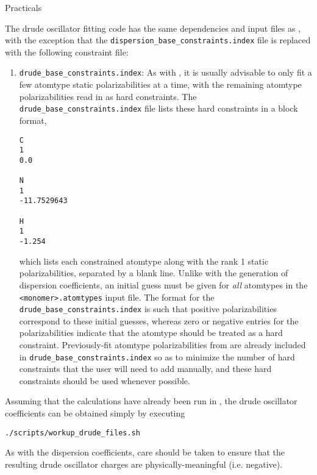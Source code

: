 \begin{subsubsection}{Practicals}

The drude oscillator fitting code has the same dependencies and input files as
\idma, with the exception that the \verb|dispersion_base_constraints.index|
file is replaced with the following constraint file:
\begin{enumerate}
\item \verb|drude_base_constraints.index|: As with \idma,
it is usually advisable to only fit a few atomtype static polarizabilities at a
time, with the remaining atomtype polarizabilities read in as hard
constraints. The \verb|drude_base_constraints.index| file lists these
hard constraints in a block format, 

\begin{minipage}{\linewidth}
\begin{lstlisting}
C
1
0.0

N     
1
-11.7529643 

H     
1
-1.254

\end{lstlisting}
\end{minipage}
which lists each constrained atomtype along with the rank 1 static
polarizabilities, separated by a blank line. Unlike with the generation of
dispersion coefficients, an initial guess must be given for \emph{all}
atomtypes in the \verb|<monomer>.atomtypes| input file.
The format for the  \verb|drude_base_constraints.index| is such that
positive polarizabilities correspond to these initial guesses, whereas zero or
negative entries for the polarizabilities indicate that the atomtype should be
treated as a hard constraint.
Previously-fit atomtype polarizabilities from  are already included in 
\verb|drude_base_constraints.index| so as to minimize the number of hard
constraints that the user will need to add manually, and these hard
constraints should be used whenever possible.
\end{enumerate}

Assuming that the \idma calculations have already been run in \camcasp, the
drude oscillator coefficients can be obtained simply by executing
%
\begin{lstlisting}
./scripts/workup_drude_files.sh
\end{lstlisting}
%
As with the dispersion coefficients, care should be taken to ensure that the
resulting drude oscillator charges are physically-meaningful (i.e. negative).

\end{subsubsection}
